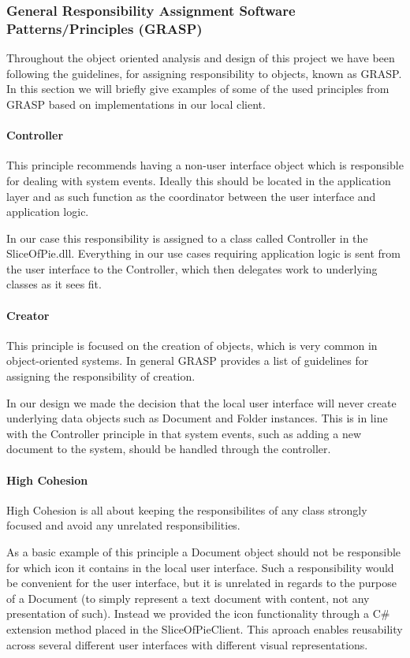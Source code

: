 \subsubsection{General Responsibility Assignment Software Patterns/Principles (GRASP)}
\label{sec:GRASP}

Throughout the object oriented analysis and design of this project we have been following the guidelines, for assigning responsibility to objects,  known as GRASP.
In this section we will briefly give examples of some of the used principles from GRASP based on implementations in our local client.

\paragraph{Controller}
This principle recommends having a non-user interface object which is responsible for dealing with system events. Ideally this should  be located in the application layer and as such function as the coordinator between the user interface and application logic.

In our case this responsibility is assigned to a class called Controller in the SliceOfPie.dll. Everything in our use cases requiring application logic is sent from the user interface to the Controller, which then delegates work to underlying classes as it sees fit.

\paragraph{Creator}
This principle is focused on the creation of objects, which is very common in object-oriented systems. In general GRASP provides a list of guidelines for assigning the responsibility of creation.

In our design we made the decision that the local user interface will never create underlying data objects such as Document and Folder instances. This is in line with the Controller principle in that system events, such as adding a new document to the system, should be handled through the controller.

\paragraph{High Cohesion}
High Cohesion is all about keeping the responsibilites of any class strongly focused and avoid any unrelated responsibilities. 

As a basic example of this principle a Document object should not be responsible for which icon it contains in the local user interface. Such a responsibility would be convenient for the user interface, but it is unrelated in regards to the purpose of a Document (to simply represent a text document with content, not any presentation of such). Instead we provided the icon functionality through a C\# extension method placed in the SliceOfPieClient. This aproach enables reusability across several different user interfaces with different visual representations.

